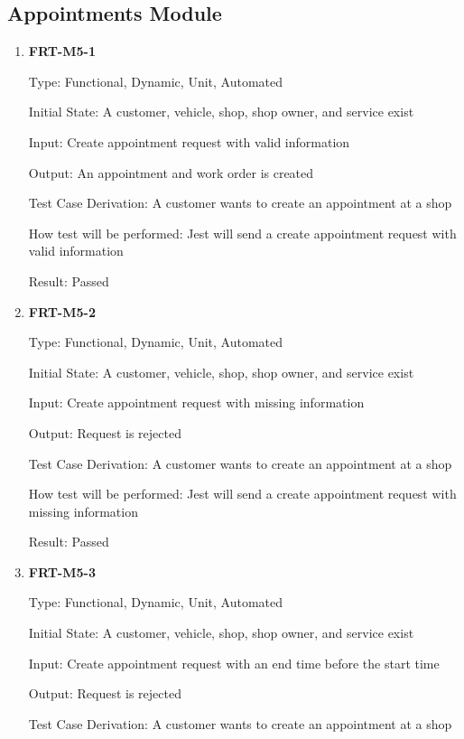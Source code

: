 \documentclass[12pt, titlepage]{article}
\begin{document}
\subsection{Appointments Module}

\begin{enumerate}

	\item \textbf{FRT-M5-1}

	      Type: Functional, Dynamic, Unit, Automated

	      Initial State: A customer, vehicle, shop, shop owner, and service exist

	      Input: Create appointment request with valid information

	      Output: An appointment and work order is created

	      Test Case Derivation: A customer wants to create an appointment at a shop

	      How test will be performed: Jest will send a create appointment request with valid information

	      Result: Passed

	\item \textbf{FRT-M5-2}

	      Type: Functional, Dynamic, Unit, Automated

	      Initial State: A customer, vehicle, shop, shop owner, and service exist

	      Input: Create appointment request with missing information

	      Output: Request is rejected

	      Test Case Derivation: A customer wants to create an appointment at a shop

	      How test will be performed: Jest will send a create appointment request with missing information

	      Result: Passed

	\item \textbf{FRT-M5-3}

	      Type: Functional, Dynamic, Unit, Automated

	      Initial State: A customer, vehicle, shop, shop owner, and service exist

	      Input: Create appointment request with an end time before the start time

	      Output: Request is rejected

	      Test Case Derivation: A customer wants to create an appointment at a shop


\end{enumerate}
\end{document}
